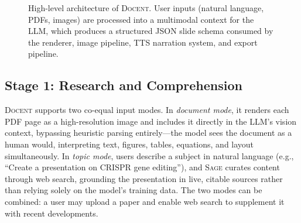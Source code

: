 \documentclass[11pt,a4paper]{article}
\newcommand{\system}{\textsc{Docent}\xspace}
\newcommand{\sage}{\textsc{Sage}\xspace}
\begin{document}
\begin{figure}[t]
\caption{High-level architecture of \system. User inputs (natural language, PDFs, images) are processed into a multimodal context for the LLM, which produces a structured JSON slide schema consumed by the renderer, image pipeline, TTS narration system, and export pipeline.}
\label{fig:architecture}
\end{figure}

\subsection{Stage 1: Research and Comprehension}

\system supports two co-equal input modes.
In \emph{document mode}, it renders each PDF page as a high-resolution image and includes it directly in the LLM's vision context, bypassing heuristic parsing entirely---the model sees the document as a human would, interpreting text, figures, tables, equations, and layout simultaneously.
In \emph{topic mode}, users describe a subject in natural language (e.g., ``Create a presentation on CRISPR gene editing''), and \sage curates content through web search, grounding the presentation in live, citable sources rather than relying solely on the model's training data.
The two modes can be combined: a user may upload a paper and enable web search to supplement it with recent developments.
\end{document}
